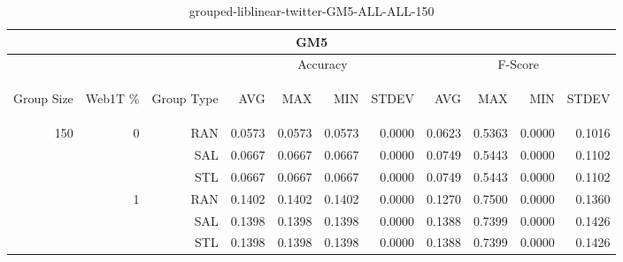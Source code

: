 \begin{center}
\begin{table}[htbp]
\begin{tabular}{ | r | r | r | r | r | r | r | r | r | r | r |}
\hline
\multicolumn{11}{|c|}{GM5}\\
\hline
 & & & \multicolumn{4}{|c|}{Accuracy} & \multicolumn{4}{|c|}{F-Score}\\ \cline{4-11}
\begin{sideways}Group Size\end{sideways} & \begin{sideways}Web1T \%\end{sideways} & \begin{sideways}Group Type\end{sideways} & \begin{sideways}AVG\end{sideways} & \begin{sideways}MAX\end{sideways} & \begin{sideways}MIN\end{sideways} & \begin{sideways}STDEV\end{sideways} & \begin{sideways}AVG\end{sideways} & \begin{sideways}MAX\end{sideways} & \begin{sideways}MIN\end{sideways} & \begin{sideways}STDEV\end{sideways}\\
\hline
\multirow{6}{*}{150}
 & \multirow{3}{*}{0} & RAN & 0.0573 & 0.0573 & 0.0573 & 0.0000 & 0.0623 & 0.5363 & 0.0000 & 0.1016\\ \cline{3-11}
 &   & SAL & 0.0667 & 0.0667 & 0.0667 & 0.0000 & 0.0749 & 0.5443 & 0.0000 & 0.1102\\ \cline{3-11}
 &   & STL & 0.0667 & 0.0667 & 0.0667 & 0.0000 & 0.0749 & 0.5443 & 0.0000 & 0.1102\\ \cline{2-11}
 & \multirow{3}{*}{1} & RAN & 0.1402 & 0.1402 & 0.1402 & 0.0000 & 0.1270 & 0.7500 & 0.0000 & 0.1360\\ \cline{3-11}
 &   & SAL & 0.1398 & 0.1398 & 0.1398 & 0.0000 & 0.1388 & 0.7399 & 0.0000 & 0.1426\\ \cline{3-11}
 &   & STL & 0.1398 & 0.1398 & 0.1398 & 0.0000 & 0.1388 & 0.7399 & 0.0000 & 0.1426\\ \cline{2-11}
\hline
\end{tabular}
\caption{grouped-liblinear-twitter-GM5-ALL-ALL-150}
\end{table}
\end{center}

